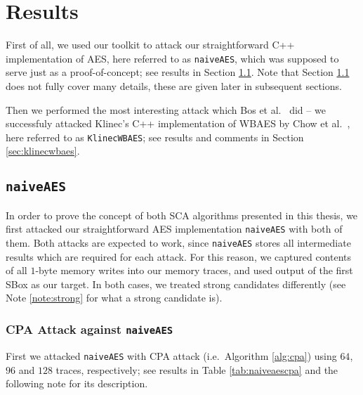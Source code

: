 \section{Results}
\label{sec:results}

First of all, we used our toolkit to attack our straightforward C++ implementation of AES, here referred to as {\tt naiveAES}, which was supposed to serve just as a proof-of-concept; see results in Section \ref{sec:naiveaes}. Note that Section \ref{sec:naiveaes} does not fully cover many details, these are given later in subsequent sections.

Then we performed the most interesting attack which Bos et al.\ \cite{bos2015differential} did -- we successfuly attacked Klinec's C++ implementation \cite{klinec2013implementation} of WBAES by Chow et al.\ \cite{chow2002aes}, here referred to as {\tt KlinecWBAES}; see results and comments in Section \ref{sec:klinecwbaes}.



\subsection{\tt naiveAES}
\label{sec:naiveaes}

In order to prove the concept of both SCA algorithms presented in this thesis, we first attacked our straightforward AES implementation {\tt naiveAES} with both of them. Both attacks are expected to work, since {\tt naiveAES} stores all intermediate results which are required for each attack. For this reason, we captured contents of all $1$-byte memory writes into our memory traces, and used output of the first SBox as our target. In both cases, we treated strong candidates differently (see Note \ref{note:strong} for what a strong candidate is).

\subsubsection{CPA Attack against {\tt naiveAES}}
	
	First we attacked {\tt naiveAES} with CPA attack (i.e.\ Algorithm \ref{alg:cpa}) using $64$, $96$ and $128$ traces, respectively; see results in Table \ref{tab:naiveaescpa} and the following note for its description.
	
